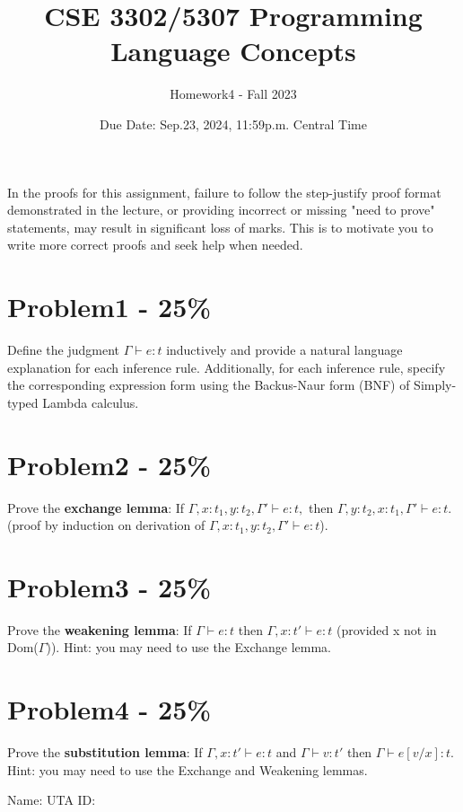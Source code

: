 \documentclass{article}
\newcommand{\studentinfo}{
    \noindent Name: \underline{\hspace{5cm}} UTA ID: \underline{\hspace{5cm}}\\
    \vspace{0.5cm} %
}
\begin{document}
\title{CSE 3302/5307 Programming Language Concepts}
\author{Homework4 - Fall 2023}
\date{Due Date: Sep.23, 2024, 11:59p.m. Central Time}
\maketitle
\thispagestyle{fancy}

\tcolorbox[]
In the proofs for this assignment, failure to follow the step-justify proof format demonstrated in the lecture, or providing incorrect or missing "need to prove" statements, may result in significant loss of marks. This is to motivate you to write more correct proofs and seek help when needed.
\endtcolorbox

\section*{Problem1 - 25\%}

Define the judgment $\Gamma \vdash e : t$ inductively and provide a natural language explanation for each inference rule. Additionally, for each inference rule, specify the corresponding expression form using the Backus-Naur form (BNF) of Simply-typed Lambda calculus.
\newpage

\section*{Problem2 - 25\%}

Prove the \textbf{exchange lemma}: If $\Gamma, x:t_1,y:t_2, \Gamma'\vdash e:t, $ then $\Gamma, y:t_2, x:t_1, \Gamma' \vdash e:t.$ (proof by induction on derivation of $\Gamma, x:t_1, y:t_2, \Gamma' \vdash e:t$).
\newpage


\section*{Problem3 - 25\%}

Prove the \textbf{weakening lemma}: If $\Gamma \vdash e:t$ then $\Gamma,x:t' \vdash e:t$ (provided x not in Dom($\Gamma$)). Hint: you may need to use the Exchange lemma.
\newpage


\section*{Problem4 - 25\%}

Prove the \textbf{substitution lemma}: If $\Gamma,x:t' \vdash e:t$ and $\Gamma \vdash v:t'$ then $\Gamma \vdash e[v/x]:t$. Hint: you may need to use the Exchange and Weakening lemmas.
\newpage


\studentinfo
\end{document}
